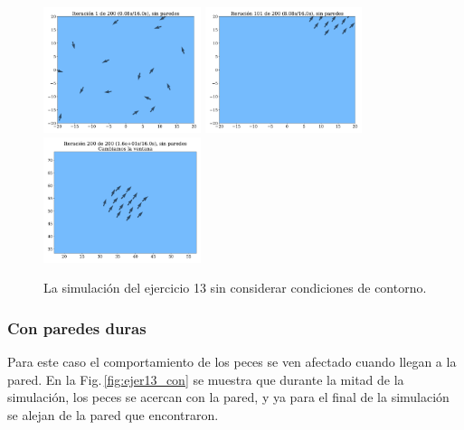 \begin{figure}[H]
	\centering
	\includegraphics[width=0.41\textwidth]{ejer_13_0False.pdf}
	\includegraphics[width=0.41\textwidth]{ejer_13_100False.pdf}
	\includegraphics[width=0.41\textwidth]{ejer_13_199False.pdf}
	\caption{La simulación del ejercicio 13 sin considerar condiciones de contorno.}
	\label{fig:ejer13_sin}
\end{figure}

\subsubsection*{Con paredes duras}

Para este caso el comportamiento de los peces se ven afectado cuando llegan a la pared. En la Fig.\,\ref{fig:ejer13_con} se muestra que durante la mitad de la simulación, los peces se acercan con la pared, y ya para el final de la simulación se alejan de la pared que encontraron.

